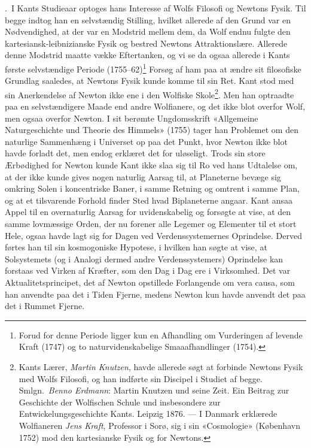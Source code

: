 \documentclass[12pt,a4paper]{article}
\begin{document}
.\ I Kants Studieaar optoges hans Interesse af Wolfs Filosofi
og Newtons Fysik. Til begge indtog han en selvstændig Stilling, hvilket
allerede af den Grund var en Nødvendighed, at der var en Modstrid mellem
dem, da Wolf endnu fulgte den kartesiansk-leibnizianske Fysik og bestred
Newtons Attraktionslære. Allerede denne Modstrid maatte vække
Eftertanken, og vi se da ogsaa allerede i Kants første selvstændige
Periode (1755--62)\footnote{Forud for dcnne Periode ligger kun en
Afhandling om Vurderingen af levende Kraft (1747) og to
naturvidenskabelige Smaaafhandlinger (1754).} Forsøg af ham paa at ændre
sit filosofiske Grundlag saaledes, at Newtons Fysik kunde komme til sin
Ret. Kant stod med sin Anerkendelse af Newton ikke ene i den Wolfiske
Skole\footnote{Kants Lærer, \emph{Martin Knutzen}, havde allerede søgt at
forbinde Newtons Fysik med Wolfs Filosofi, og han indførte sin Discipel i
Studiet af begge. Smlgn.\ \emph{Benno Erdmann}: Martin Knutzen und seine
Zeit. Ein Beitrag zur Geschichte der Wolfischen Schule und insbesondere
zur Entwickelungsgeschichte Kants. Leipzig 1876. --- I Danmark erklærede
Wolfianeren \emph{Jens Kraft}, Professor i Sorø, sig i sin «Cosmologie»
(København 1752) mod den kartesianske Fysik og for Newtons.}. Men han
optraadte paa en selvstændigere Maade end andre Wolfianere, og det ikke
blot overfor Wolf, men ogsaa overfor Newton. I sit berømte
Ungdomsskrift «Allgemeine Naturgeschichte und Theorie des Himmels»
(1755) tager han Problemet om den naturlige Sammenhæng i Universet op paa
det Punkt, hvor Newton ikke blot havde forladt det, men endog erklæret
det for uløseligt. Trods sin store Ærbødighed for Newton kunde Kant ikke
slaa sig til Ro ved hans Udtalelse om, at der ikke kunde gives nogen
naturlig Aarsag til, at Planeterne bevæge sig omkring Solen i koncentriske
Baner, i samme Retning og omtrent i samme Plan, og at et tilsvarende
Forhold finder Sted hvad Biplaneterne angaar. Kant ansaa Appel til en
overnaturlig Aarsag for uvidenskabelig og forsøgte at vise, at den samme
lovmæssige Orden, der nu forener alle Legemer og Elementer til et stort
Hele, ogsaa havde lagt sig for Dagen ved Verdenssystemernes Oprindelse.
Derved førtes han til sin kosmogoniske Hypotese, i hvilken han søgte at
vise, at Solsystemets (og i Analogi dermed andre Verdenssystemers)
Oprindelse kan forstaas ved Virken af Kræfter, som den Dag i Dag ere i
Virksomhed. Det var Aktualitetsprincipet, det af Newton opstillede
Forlangende om vera causa, som han anvendte paa det i Tiden
Fjerne, medens Newton kun havde anvendt det paa det i Rummet Fjerne.
\end{document}
